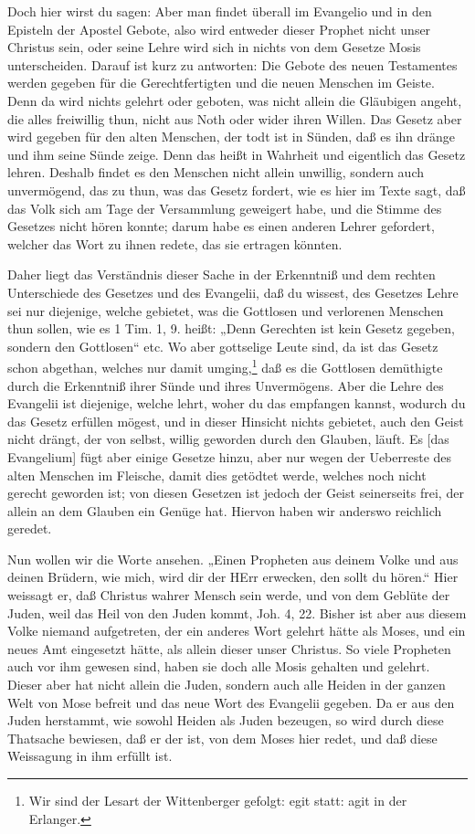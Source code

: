 Doch hier wirst du sagen: Aber man findet überall im Evangelio und in den Episteln der
Apostel Gebote, also wird entweder dieser Prophet nicht unser Christus sein, oder seine Lehre wird sich in nichts von dem Gesetze Mosis unterscheiden. Darauf ist kurz zu antworten: Die Gebote des neuen Testamentes werden gegeben für die Gerechtfertigten und die neuen Menschen im Geiste. Denn da wird nichts gelehrt oder geboten, was nicht allein die Gläubigen angeht, die alles freiwillig thun, nicht aus Noth oder wider ihren Willen. Das Gesetz aber wird gegeben für den alten Menschen, der todt ist in Sünden, daß es ihn dränge und ihm seine Sünde zeige. Denn das heißt in Wahrheit und eigentlich das Gesetz lehren. Deshalb findet es den Menschen nicht allein unwillig, sondern auch unvermögend, das zu thun, was das Gesetz fordert, wie es hier im Texte sagt, daß das Volk sich am Tage der Versammlung geweigert habe, und die Stimme des Gesetzes nicht hören konnte; darum habe es einen anderen Lehrer gefordert, welcher das Wort zu ihnen redete, das sie ertragen könnten.

Daher liegt das Verständnis dieser Sache in der Erkenntniß und dem rechten Unterschiede des Gesetzes und des Evangelii, daß du wissest, des Gesetzes Lehre sei nur diejenige, welche gebietet, was die Gottlosen und verlorenen Menschen thun sollen, wie es 1 Tim. 1, 9. heißt: „Denn Gerechten ist kein Gesetz gegeben, sondern den Gottlosen“ etc. Wo aber gottselige Leute sind, da ist das Gesetz schon abgethan, welches nur damit umging,\footnote{Wir sind der Lesart der Wittenberger gefolgt: egit statt: agit in der Erlanger.} daß es die Gottlosen demüthigte durch die Erkenntniß ihrer Sünde und ihres Unvermögens. Aber die Lehre des Evangelii ist diejenige, welche lehrt, woher du das empfangen kannst, wodurch du das Gesetz erfüllen mögest, und in dieser Hinsicht nichts gebietet, auch den Geist nicht drängt, der von selbst, willig geworden durch den Glauben, läuft. Es [das Evangelium] fügt aber einige Gesetze hinzu, aber nur wegen der Ueberreste des alten Menschen im Fleische, damit dies getödtet werde, welches noch nicht gerecht geworden ist; von diesen Gesetzen ist jedoch der Geist seinerseits frei, der allein an dem Glauben ein Genüge hat. Hiervon haben wir anderswo reichlich geredet.

Nun wollen wir die Worte ansehen. „Einen Propheten aus deinem Volke und aus deinen Brüdern, wie mich, wird dir der HErr erwecken, den sollt du hören.“ Hier weissagt er, daß Christus wahrer Mensch sein werde, und von dem Geblüte der Juden, weil das Heil von den Juden kommt, Joh. 4, 22. Bisher ist aber aus diesem Volke niemand aufgetreten, der ein anderes Wort gelehrt hätte als Moses, und ein neues Amt eingesetzt hätte, als allein dieser unser Christus. So viele Propheten auch vor ihm gewesen sind, haben sie doch alle Mosis gehalten und gelehrt. Dieser aber hat nicht allein die Juden, sondern auch alle Heiden in der ganzen Welt von Mose befreit und das neue Wort des Evangelii gegeben. Da er aus den Juden herstammt, wie sowohl Heiden als Juden bezeugen, so wird durch diese Thatsache bewiesen, daß er der ist, von dem Moses hier redet, und daß diese Weissagung in ihm erfüllt ist.

